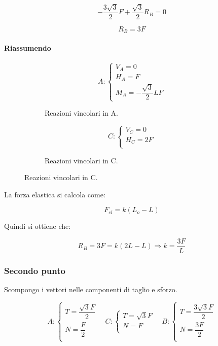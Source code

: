\documentclass[main.tex]{subfiles}
\begin{document}
\[
	-\dfrac{3\sqrt{3}}{2}F + \dfrac{\sqrt{3}}{2}R_B = 0
\]

\[
	R_B = 3F
\]

\paragraph{Riassumendo}

\begin{figure}[H]
  \begin{subfigure}[b]{.5\textwidth}
  \centering
  \[
  	A: \begin{cases}
		V_A = 0\\
		H_A = F\\
		M_A = -\dfrac{\sqrt{3}}{2}LF
  	\end{cases}
  \]
  \caption{Reazioni vincolari in A.}
  \end{subfigure}
  \hfill
  \begin{subfigure}[b]{.5\textwidth}
  \centering
  \[
  	C: \begin{cases}
  		V_C = 0\\
  		H_C = 2F\\
  	\end{cases}
  \]
  \caption{Reazioni vincolari in C.}
  \end{subfigure}
\end{figure}

La forza elastica si calcola come:

\[
	F_{el} = k(L_o - L)
\]

Quindi si ottiene che:

\[
	R_B = 3F = k(2L - L)
	\Longrightarrow
	k = \dfrac{3F}{L}
\]

\subsubsection{Secondo punto}
Scompongo i vettori nelle componenti di taglio e sforzo.

\[
A: \begin{cases}
T = \dfrac{\sqrt{3}F}{2}\\
N = \dfrac{F}{2}\\
\end{cases}
\quad
C: \begin{cases}
T = \sqrt{3}F\\
N = F\\
\end{cases}
\quad
B: \begin{cases}
T = \dfrac{3\sqrt{3}F}{2}\\
N = \dfrac{3F}{2}\\
\end{cases}
\]
\end{document}
